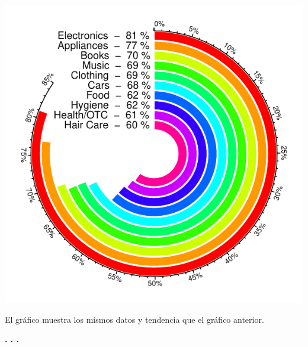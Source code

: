 \documentclass{article}\usepackage[]{graphicx}\usepackage[]{color}
\makeatletter
\def\maxwidth{ %
  \ifdim\Gin@nat@width>\linewidth
    \linewidth
  \else
    \Gin@nat@width
  \fi
}
\newenvironment{knitrout}{}{} %
\makeatother
\begin{document}
\begin{knitrout}
\color{fgcolor}

{\centering \includegraphics[width=\maxwidth]{figure/plot_circlize_cb-1} 

}



\end{knitrout}
El gr\'afico muestra los mismos datos y tendencia que el gr\'afico anterior.
\begin{center}
\textbf{. . .}
\end{center}
\end{document}
